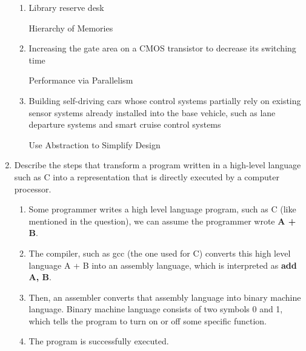 \documentclass[10pt]{article}
\begin{document}
\begin{enumerate}
\begin{enumerate}
        \item Library reserve desk
        \begin{description}
            \item[Hierarchy of Memories] 
        \end{description}

        \item Increasing the gate area on a CMOS transistor to decrease its switching time
        \begin{description}
            \item[Performance via Parallelism] 
        \end{description}

        \item Building self-driving cars whose control systems partially rely on existing sensor systems already installed into the base vehicle, such as lane departure systems and smart cruise control systems
        \begin{description}
            \item[Use Abstraction to Simplify Design] 
        \end{description}
    \end{enumerate}
    
    \item Describe the steps that transform a program written in a high-level language such as C into a representation that is directly executed by a computer processor.
    \begin{enumerate}
        \item Some programmer writes a high level language program, such as C (like mentioned in the question),
        we can assume the programmer wrote \textbf{A + B}.
        \item The compiler, such as gcc (the one used for C) converts this high level language A + B into an
        assembly language, which is interpreted as \textbf{add A, B}.
        \item Then, an assembler converts that assembly language into binary machine language. Binary machine
        language consists of two symbols 0 and 1, which tells the program to turn on or off some specific
        function.
        \item The program is successfully executed.
    \end{enumerate}


\end{enumerate}
\end{document}
